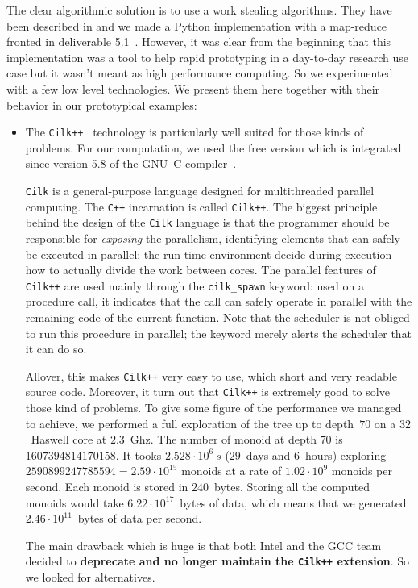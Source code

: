\documentclass{deliverablereport}
\newcommand{\Cilk}{\texttt{Cilk}\xspace}
\newcommand{\CilkP}{\texttt{Cilk++}\xspace}
\newcommand{\CPP}{\texttt{C++}\xspace}
\begin{document}
The clear algorithmic solution is to use a work stealing algorithms. They have
been described in \cite{10.1109/SFCS.1994.365680, BlumofeL99} and we made a
Python implementation with a map-reduce fronted in deliverable
5.1~\cite{map-reduce}. However, it was clear from the beginning that this
implementation was a tool to help rapid prototyping in a day-to-day research
use case but it wasn't meant as high performance computing. So we experimented
with a few low level technologies. We present them here together with their
behavior in our prototypical examples:
\begin{itemize}
\item The \CilkP~\cite{CilkIntel} technology is particularly well suited for
  those kinds of problems. For our computation, we used the free version which
  is integrated since version 5.8 of the GNU~C compiler~\cite{GCCcilk}.

  \Cilk is a general-purpose language designed for multithreaded parallel
  computing. The \CPP incarnation is called \CilkP. The biggest principle
  behind the design of the \Cilk language is that the programmer should be
  responsible for \emph{exposing} the parallelism, identifying elements that
  can safely be executed in parallel; the run-time environment decide during
  execution how to actually divide the work between cores. The parallel
  features of \CilkP are used mainly through the \texttt{cilk\_spawn} keyword:
  used on a procedure call, it indicates that the call can safely operate in
  parallel with the remaining code of the current function. Note that the
  scheduler is not obliged to run this procedure in parallel; the keyword
  merely alerts the scheduler that it can do so.

  Allover, this makes \CilkP very easy to use, which short and very readable
  source code. Moreover, it turn out that \CilkP is extremely good to solve
  those kind of problems.  To give some figure of the performance we managed
  to achieve, we performed a full exploration of the tree up to depth~$70$ on
  a $32$~Haswell core at $2.3$~Ghz. The number of monoid at depth $70$ is
  $1607394814170158$.  It tooks $2.528\cdot10^{6}~s$ ($29$~days and $6$~hours)
  exploring $2590899247785594=2.59\cdot10^{15}$ monoids at a rate of
  $1.02\cdot10^{9}$ monoids per second. Each monoid is stored in
  $240$~bytes. Storing all the computed monoids would take
  $6.22\cdot10^{17}$~bytes of data, which means that we generated
  $2.46\cdot10^{11}$~bytes of data per second.

  The main drawback which is huge is that both Intel and the GCC team decided
  to \textbf{deprecate and no longer maintain the \CilkP extension}. So we
  looked for alternatives.


\end{itemize}
\end{document}
